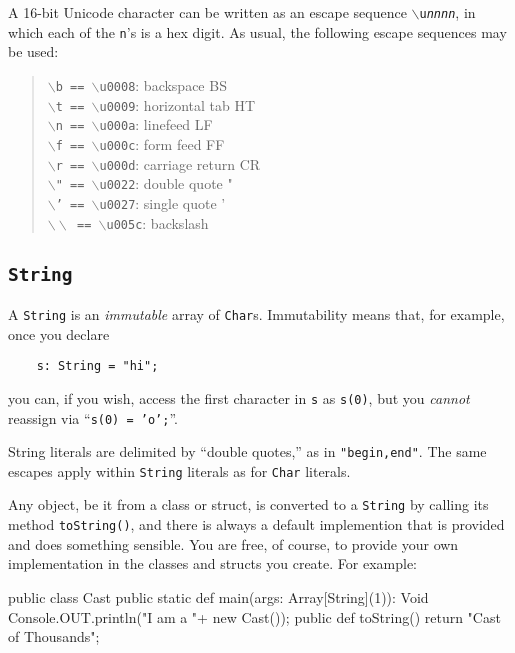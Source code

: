 A 16-bit Unicode character can be written as an escape sequence
$\backslash${\tt u{\em nnnn}}, in which each of the {\tt n}'s is a hex digit. 
As usual, the following escape sequences may be used:
\begin{quote}
 {\tt $\backslash$b == $\backslash$u0008}: backspace BS\\              
 {\tt $\backslash$t == $\backslash$u0009}: horizontal tab HT\\       
 {\tt $\backslash$n == $\backslash$u000a}: linefeed LF\\
 {\tt $\backslash$f == $\backslash$u000c}: form feed FF\\
 {\tt $\backslash$r == $\backslash$u000d}: carriage return CR\\
 {\tt $\backslash$" == $\backslash$u0022}: double quote "\\
 {\tt $\backslash$' == $\backslash$u0027}: single quote '\\
 {\tt $\backslash\backslash$ == $\backslash$u005c}: backslash           
\end{quote}
\subsection{\tt String}

A {\tt String} is an {\em immutable} array of {\tt Char}s.  Immutability means
that, for example, once you declare
\begin{verbatim}
    s: String = "hi";
\end{verbatim}
you can, if you wish, access the first character in {\tt s} as {\tt s(0)}, but
you {\em cannot} reassign via ``{\tt s(0) = 'o';}''.

String literals are delimited by ``double quotes,'' as in {\tt "begin,end"}. 
The same escapes apply within {\tt String} literals as for {\tt Char} literals.

Any object, be it from a class or struct, is converted to a {\tt String} by
calling its method {\tt toString()}, and there is always a default implemention
that is provided and does something sensible.  You are free, of course, to
provide your own implementation in the classes and structs you create.  For
example:

\begin{xtennum}[]
public class Cast {
    public static def main(args: Array[String](1)): Void {
       Console.OUT.println("I am a "+ new Cast()); 
    }
    public def toString() { return "Cast of Thousands"; }
}
\end{xtennum}



